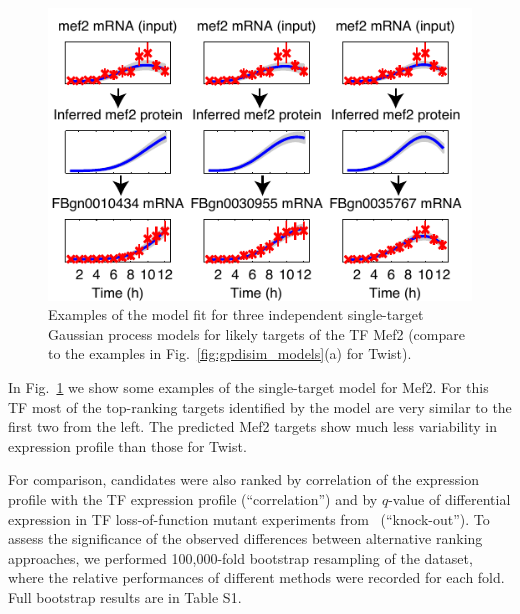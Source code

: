\documentclass{pnastwo}
\begin{document}
\begin{article}
\begin{figure}[tb]
  \centering
  \includegraphics{fig2}
  \caption{Examples of the model fit for three independent single-target Gaussian process models for
    likely targets of the TF Mef2 (compare to the examples in Fig.~\ref{fig:gpdisim_models}(a) for Twist).\label{fig:gpdisim_mef2_models} }
\end{figure}

In Fig.~\ref{fig:gpdisim_mef2_models} we show some examples of the single-target model for Mef2.  For this TF most of the
top-ranking targets identified by the model are very similar to the first two from the left. The predicted Mef2 targets show much less variability in expression profile than those for Twist. 

For comparison, candidates were also ranked by correlation of the
expression profile with the TF expression profile (``correlation'')
and by $q$-value of differential expression in TF loss-of-function mutant
experiments from~\cite{Sandmann2006a,Sandmann2007} (``knock-out''). 
To assess the significance of the observed differences between
alternative ranking approaches, we performed 100,000-fold bootstrap
resampling of the dataset, where the
relative performances of different methods were recorded for each
fold. Full bootstrap results are in Table S1.




\end{article}
\end{document}
